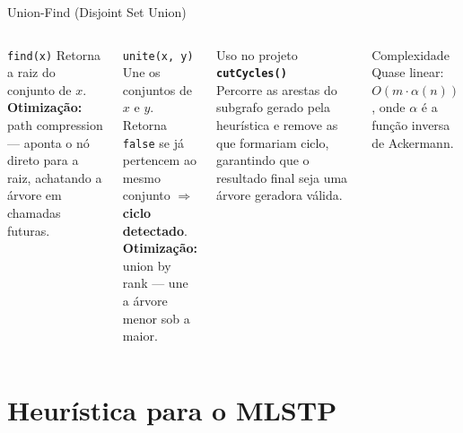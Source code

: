 \documentclass{beamer}
\begin{document}
\begin{frame}{Union-Find (Disjoint Set Union)}

\begin{columns}[T]

    \begin{block}{\texttt{find(x)}}
        Retorna a raiz do conjunto de $x$.\\[0.2cm]
        \textbf{Otimização:} path compression — aponta o nó direto para a raiz, achatando a árvore em chamadas futuras.
    \end{block}

    \vspace{0.3cm}

    \begin{block}{\texttt{unite(x, y)}}
        Une os conjuntos de $x$ e $y$.\\[0.2cm]
        Retorna \texttt{false} se já pertencem ao mesmo conjunto $\Rightarrow$ \textbf{ciclo detectado}.\\[0.2cm]
        \textbf{Otimização:} union by rank — une a árvore menor sob a maior.
    \end{block}

    \begin{exampleblock}{Uso no projeto}
        \textbf{\texttt{cutCycles()}}\\
        Percorre as arestas do subgrafo gerado pela heurística e remove as que formariam ciclo, garantindo que o resultado final seja uma árvore geradora válida.
    \end{exampleblock}

    \vspace{0.3cm}

    \begin{alertblock}{Complexidade}
        Quase linear: $O(m \cdot \alpha(n))$, onde $\alpha$ é a função inversa de Ackermann.
    \end{alertblock}

\end{columns}

\end{frame}

\section{Heurística para o MLSTP}
\end{document}
